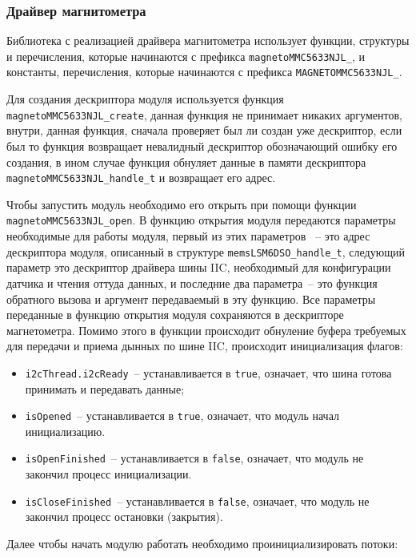\subsubsection{Драйвер магнитометра}

Библиотека с реализацией драйвера магнитометра использует функции, структуры и перечисления,
которые начинаются с префикса \lstinline{magnetoMMC5633NJL_}, и константы, перечисления, которые начинаются с префикса \lstinline{MAGNETOMMC5633NJL_}.

Для создания дескриптора модуля используется функция
\lstinline{magnetoMMC5633NJL_create}, данная функция не принимает никаких аргументов, внутри, данная функция, сначала проверяет
был ли создан уже дескриптор, если был то функция возвращает невалидный дескриптор обозначающий ошибку его создания, в ином случае
функция обнуляет данные в памяти дескриптора \lstinline{magnetoMMC5633NJL_handle_t} и возвращает его адрес. 

Чтобы запустить модуль необходимо его открыть при помощи функции
\lstinline{magnetoMMC5633NJL_open}. В функцию открытия модуля передаются параметры необходимые для работы модуля, первый из этих параметров
~-- это адрес дескриптора модуля, описанный в структуре \lstinline{memsLSM6DSO_handle_t}, следующий параметр это дескриптор драйвера шины IIC, необходимый для конфигурации датчика и чтения оттуда данных, и последние два параметра~--
это функция обратного вызова и аргумент передаваемый в эту функцию. Все параметры переданные в функцию открытия модуля сохраняются в дескрипторе магнетометра.
Помимо этого в функции происходит обнуление буфера требуемых для передачи и приема дынных по шине IIC, происходит инициализация флагов:

\begin{itemize}
    \item \lstinline{i2cThread.i2cReady}~-- устанавливается в \lstinline{true}, означает, что шина готова принимать и передавать данные;
    \item \lstinline{isOpened}~-- устанавливается в \lstinline{true}, означает, что модуль начал инициализацию.
    \item \lstinline{isOpenFinished}~-- устанавливается в \lstinline{false}, означает, что модуль не закончил процесс инициализации.
    \item \lstinline{isCloseFinished}~-- устанавливается в \lstinline{false}, означает, что модуль не закончил процесс остановки (закрытия).
\end{itemize}

Далее чтобы начать модулю работать необходимо проинициализировать потоки:

